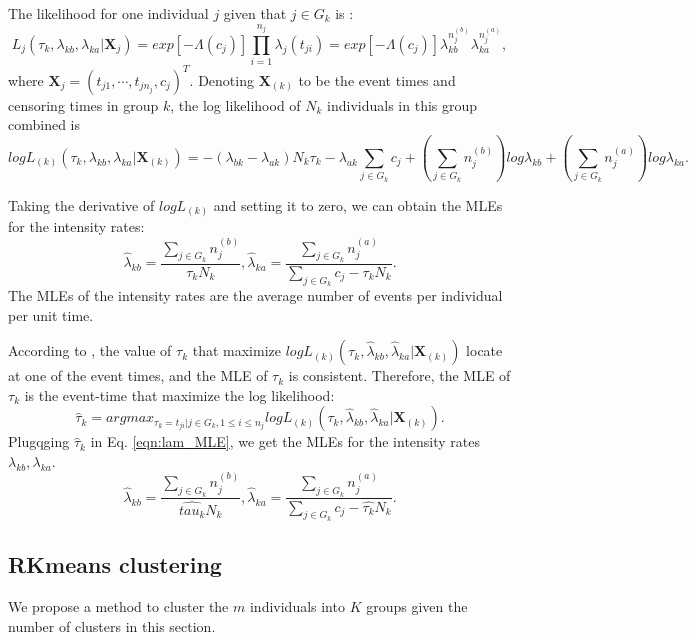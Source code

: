 \documentclass[12pt]{article}
\begin{document}
 The likelihood for one individual $j$ given that $j \in G_k$ is \citep{Thompson2012}: 
$$L_{j}(\tau_k,\lambda_{kb},\lambda_{ka}|\pmb X_j)=exp[-\Lambda(c_j)]\prod_{i=1}^{n_j}\lambda_j(t_{ji})=exp[-\Lambda(c_j)]\lambda_{kb}^{n_j^{(b)}}\lambda_{ka}^{n_j^{(a)}},$$ where $\pmb X_j = (t_{j1}, \cdots, t_{jn_j}, c_j)^T$.
Denoting $\pmb X_{(k)}$ to be the event times and censoring times in group $k$, the log likelihood of $N_k$ individuals in this group combined is
\begin{equation}
logL_{(k)}(\tau_k,\lambda_{kb},\lambda_{ka}|\pmb X_{(k)})=-(\lambda_{bk}-\lambda_{ak})N_k\tau_k-\lambda_{ak}\sum_{j \in G_k}c_j+\left( \sum_{j \in G_k}n_j^{(b)}\right) log \lambda_{kb}
+\left( \sum_{j \in G_k}n_j^{(a)}\right) log\lambda_{ka}.
\end{equation}

Taking the derivative of $logL_{(k)}$ and setting it to zero,  we can obtain the MLEs for the intensity rates: 
\begin{equation}\label{eqn:lam_MLE}
\hat{\lambda}_{kb}=\frac{\sum_{j \in G_k}n_j^{(b)}}{\tau_kN_k},\hat{\lambda}_{ka}=\frac{\sum_{j \in G_k}n_j^{(a)}}{\sum_{j \in G_k}c_j- \tau_kN_k}.
\end{equation}
The MLEs of the intensity rates are the average number of events per individual per unit time. 

According to \citet{Frobish2009}, the value of $\tau_k$ that maximize $logL_(k)(\tau_k,\hat\lambda_{kb},\hat\lambda_{ka}|\pmb X_{(k)})$ locate at one of the event times, and the MLE of $\tau_k$ is consistent. Therefore, the MLE of $\tau_k$ is the event-time that maximize the log likelihood:  
\begin{equation}\label{eqn:tau_MLE}
\hat\tau_k= argmax_{\tau_k = t_{ji}|j \in G_k, 1\leq i \leq n_j}logL_{(k)}(\tau_k,\hat\lambda_{kb},\hat\lambda_{ka}|\pmb X_{(k)}).
\end{equation} 
Plugqging $\hat\tau_k$ in Eq. \ref{eqn:lam_MLE}, we get the MLEs for the intensity rates $\lambda_{kb},\lambda_{ka}$.
\begin{equation}\label{eqn:lam}
\hat{\lambda}_{kb}=\frac{\sum_{j \in G_k}n_j^{(b)}}{\hat{tau_k}N_k},\hat{\lambda}_{ka}=\frac{\sum_{j \in G_k}n_j^{(a)}}{\sum_{j \in G_k}c_j- \hat{\tau_k}N_k}.
\end{equation}
\subsection{RKmeans clustering}\label{sec:kmean}
We propose a method to cluster the $m$ individuals into $K$ groups given the number of clusters in this section. 
\end{document}

